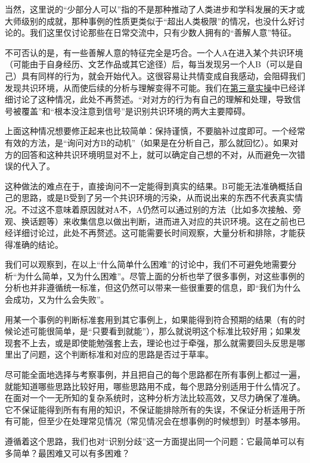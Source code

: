 \begin{explain}
当然，这里说的“少部分人可以”指的不是那种推动了人类进步和学科发展的天才或大师级别的成就，那种事例的性质更类似于“超出人类极限”的情况，也没什么好讨论的。我们这里仅讨论那些在日常交流中，只有少数人拥有的“善解人意”特征。

不可否认的是，有一些善解人意的特征完全是巧合。一个人A在进入某个共识环境（可能由于自身经历、文艺作品或其它途径）后，每当发现另一个人B（可以是自己）具有同样的行为，就会开始代入。这很容易让共情变成自我感动，会阻碍我们发现共识环境，从而使后续的分析与理解变得不可能。我们在\hyperref[sec:情绪、感受与其分析与处理方法]{第三章实操}中已经详细讨论了这种情况，此处不再赘述。“对对方的行为有自己的理解和处理，导致信号被覆盖”和“根本没注意到信号”是识别共识环境的两大主要障碍。

上面这种情况想要修正起来也比较简单：保持谨慎，不要脑补过度即可。一个经常有效的方法，是“询问对方B的动机”（如果是在分析自己，那么就回忆）。如果对方的回答和这种共识环境明显对不上，就可以确定自己想的不对，从而避免一次错误的代入了。

这种做法的难点在于，直接询问不一定能得到真实的结果。B可能无法准确概括自己的思路，或是B受到了另一个共识环境的污染，从而说出来的东西不代表真实情况。不过这不意味着原因就对A不，A仍然可以通过别的方法（比如多次接触、旁观、换话题等）来收集信息以做出判断，进而进入对应的共识环境。这在之前也已经详细讨论过，此处不再赘述。这可能需要长时间观察，大量分析和排除，才能获得准确的结论。
\end{explain}
我们可以观察到，在以上“什么简单什么困难”的讨论中，我们不可避免地需要分析“为什么简单，又为什么困难”。尽管上面的分析也举了很多事例，对这些事例的分析也并非遵循统一标准，但这仍然可以带来一些很重要的信息，即“我们为什么会成功，又为什么会失败”。

用某一个事例的判断标准套用到其它事例上，如果能得到符合预期的结果（有的时候论述可能很简单，是“只要看到就能”），那么就说明这个标准比较好用；如果发现套不上去，或是即使能勉强套上去，理论也过于牵强，那么就需要回头反思是哪里出了问题，这个判断标准和对应的思路是否过于草率。

尽可能全面地选择与考察事例，并且把自己的每个思路都在所有事例上都过一遍，就能知道哪些思路比较好用，哪些思路用不成，每个思路分别适用于什么情况了。在面对一个一无所知的复杂系统时，这种分析方法比较高效，又尽力确保了准确。它不保证能得到所有有用的知识，不保证能排除所有的失误，不保证分析适用于所有可能，但至少在处理常见情况（常见情况会在想事例的时候想到）时基本够用。

\divider

遵循着这个思路，我们也对“识别分歧”这一方面提出同一个问题：它最简单可以有多简单？最困难又可以有多困难？


